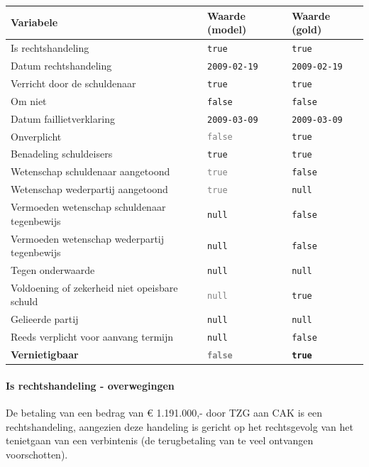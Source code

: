 \documentclass[
  dutch,
  a4paper,
]{article}
\begin{document}
\begin{center}
\small
\begin{tabular}{@{}p{7.4cm}p{2.6cm}p{2.6cm}@{}}
\toprule
Variabele & Waarde (model) & Waarde (gold) \\
\midrule
Is rechtshandeling & \texttt{true} & \texttt{true} \\
Datum rechtshandeling & \texttt{2009-02-19} & \texttt{2009-02-19} \\
Verricht door de schuldenaar & \texttt{true} & \texttt{true} \\
Om niet & \texttt{false} & \texttt{false} \\
Datum faillietverklaring & \texttt{2009-03-09} & \texttt{2009-03-09} \\
Onverplicht & \textcolor{gray}{\texttt{false}} & \texttt{true} \\
Benadeling schuldeisers & \texttt{true} & \texttt{true} \\
Wetenschap schuldenaar aangetoond & \textcolor{gray}{\texttt{true}} & \texttt{false} \\
Wetenschap wederpartij aangetoond & \textcolor{gray}{\texttt{true}} & \texttt{null} \\
Vermoeden wetenschap schuldenaar tegenbewijs & \texttt{null} & \texttt{false} \\
Vermoeden wetenschap wederpartij tegenbewijs & \texttt{null} & \texttt{false} \\
Tegen onderwaarde & \texttt{null} & \texttt{null} \\
Voldoening of zekerheid niet opeisbare schuld & \textcolor{gray}{\texttt{null}} & \texttt{true} \\
Gelieerde partij & \texttt{null} & \texttt{null} \\
Reeds verplicht voor aanvang termijn & \texttt{null} & \texttt{false} \\
\textbf{Vernietigbaar} & \textbf{\textcolor{gray}{\texttt{false}}} & \textbf{\texttt{true}} \\
\bottomrule
\end{tabular}
\end{center}

\paragraph{Is rechtshandeling - overwegingen}\label{is-rechtshandeling---overwegingen-89}

De betaling van een bedrag van € 1.191.000,- door TZG aan CAK is een rechtshandeling, aangezien deze handeling is gericht op het rechtsgevolg van het tenietgaan van een verbintenis (de terugbetaling van te veel ontvangen voorschotten).
\end{document}
